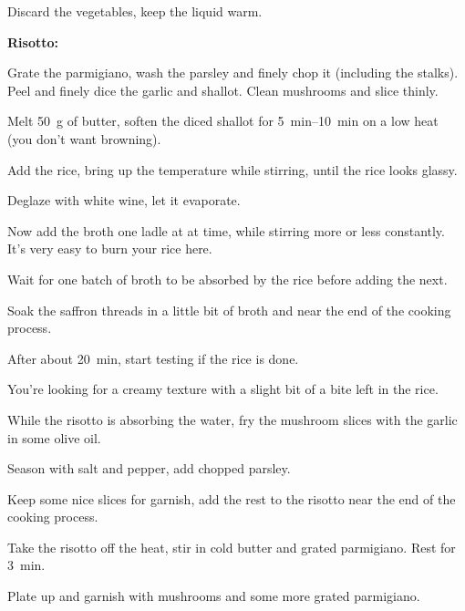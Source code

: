 \begin{recipe}
{		\step Discard the vegetables, keep the liquid warm.

		\textbf{Risotto:}

		\step Grate the parmigiano, wash the parsley and finely chop it (including the stalks). Peel and finely dice the garlic and shallot. Clean mushrooms and slice thinly.

		\step Melt \SI{50}{\gram} of butter, soften the diced shallot for \SIrange{5}{10}{\minute} on a low heat (you don't want browning).

		\step Add the rice, bring up the temperature while stirring, until the rice looks glassy.

		\step Deglaze with white wine, let it evaporate.

		\vspace{1em}

		\step Now add the broth one ladle at at time, while stirring more or less constantly. It's very easy to burn your rice here.

		Wait for one batch of broth to be absorbed by the rice before adding the next.

		\step Soak the saffron threads in a little bit of broth and near the end of the cooking process.

		\step After about \SI{20}{\minute}, start testing if the rice is done.

		\vspace{1em}

		You're looking for a creamy texture with a slight bit of a bite left in the rice.

		\step While the risotto is absorbing the water, fry the mushroom slices with the garlic in some olive oil.

		\step Season with salt and pepper, add chopped parsley.

		\vspace{1em}

		Keep some nice slices for garnish, add the rest to the risotto near the end of the cooking process.

		\step Take the risotto off the heat, stir in cold butter and grated parmigiano. Rest for \SI{3}{\minute}.

		\step Plate up and garnish with mushrooms and some more grated parmigiano.
	}

\end{recipe}